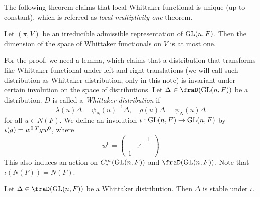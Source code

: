 The following theorem claims that local Whittaker functional is unique (up to constant), which is referred as \emph{local multiplicity one} theorem. 
\begin{theorem}
\label{nonarchmultone}
Let $(\pi, V)$ be an irreducible admissible representation of $\mathrm{GL}(n, F)$. Then the dimension of the space of Whittaker functionals on $V$ is at most one. 
\end{theorem}

For the proof, we need a lemma, which claims that a distribution that transforms like Whittaker functional under left and right translations (we will call such distribution as Whittaker distribution, only in this note) is invariant under certain involution on the space of distributions. 
Let $\Delta\in\fraD(\GL(n, F))$ be a distribution. $D$ is called a \emph{Whittaker distribution} if 
$$
\lambda(u) \Delta = \psi_{N}(u)^{-1}\Delta, \quad \rho(u)\Delta = \psi_{N}(u)\Delta
$$
for all $u\in N(F)$. 
We define an involution $\iota:\mathrm{GL}(n, F) \to \mathrm{GL}(n, F)$ by $\iota(g) = w^{0}\prescript{T}{}{}gw^{0}$, where 
$$
w^{0} =\begin{pmatrix} & & 1 \\ & \iddots & \\1 & & \end{pmatrix}
$$
This also induces an action on $C^{\infty}_{c}(\mathrm{GL}(n, F))$ and $\fraD(\GL(n, F))$. Note that $\iota(N(F)) = N(F)$. 
\begin{theorem}
Let $\Delta\in \fraD(\GL(n, F))$ be a Whittaker distribution. Then $\Delta$ is stable under $\iota$. 
\end{theorem}


